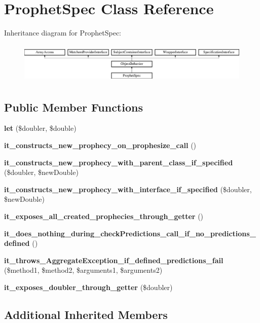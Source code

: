 \section{Prophet\+Spec Class Reference}
\label{classspec_1_1_prophecy_1_1_prophet_spec}
Inheritance diagram for Prophet\+Spec\+:\begin{figure}[H]
\begin{center}
\leavevmode
\includegraphics[height=1.953488cm]{classspec_1_1_prophecy_1_1_prophet_spec}
\end{center}
\end{figure}
\subsection*{Public Member Functions}
\begin{DoxyCompactItemize}
\item 
{\bf let} (\$doubler, \$double)
\item 
{\bf it\+\_\+constructs\+\_\+new\+\_\+prophecy\+\_\+on\+\_\+prophesize\+\_\+call} ()
\item 
{\bf it\+\_\+constructs\+\_\+new\+\_\+prophecy\+\_\+with\+\_\+parent\+\_\+class\+\_\+if\+\_\+specified} (\$doubler, \$new\+Double)
\item 
{\bf it\+\_\+constructs\+\_\+new\+\_\+prophecy\+\_\+with\+\_\+interface\+\_\+if\+\_\+specified} (\$doubler, \$new\+Double)
\item 
{\bf it\+\_\+exposes\+\_\+all\+\_\+created\+\_\+prophecies\+\_\+through\+\_\+getter} ()
\item 
{\bf it\+\_\+does\+\_\+nothing\+\_\+during\+\_\+check\+Predictions\+\_\+call\+\_\+if\+\_\+no\+\_\+predictions\+\_\+defined} ()
\item 
{\bf it\+\_\+throws\+\_\+\+Aggregate\+Exception\+\_\+if\+\_\+defined\+\_\+predictions\+\_\+fail} (\$method1, \$method2, \$arguments1, \$arguments2)
\item 
{\bf it\+\_\+exposes\+\_\+doubler\+\_\+through\+\_\+getter} (\$doubler)
\end{DoxyCompactItemize}
\subsection*{Additional Inherited Members}


